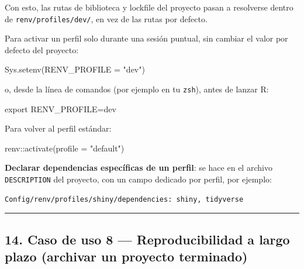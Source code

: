 \documentclass[
  man,
  floatsintext,
  longtable,
  a4paper,
  nolmodern,
  notxfonts,
  notimes,
  12pt,
  colorlinks=true,linkcolor=blue,citecolor=blue,urlcolor=blue]{apa7}
\newenvironment{Shaded}{\begin{snugshade}}{\end{snugshade}}
\newcommand{\AttributeTok}[1]{\textcolor[rgb]{0.40,0.45,0.13}{#1}}
\newcommand{\BuiltInTok}[1]{\textcolor[rgb]{0.00,0.23,0.31}{#1}}
\newcommand{\FunctionTok}[1]{\textcolor[rgb]{0.28,0.35,0.67}{#1}}
\newcommand{\NormalTok}[1]{\textcolor[rgb]{0.00,0.23,0.31}{#1}}
\newcommand{\OperatorTok}[1]{\textcolor[rgb]{0.37,0.37,0.37}{#1}}
\newcommand{\SpecialCharTok}[1]{\textcolor[rgb]{0.37,0.37,0.37}{#1}}
\newcommand{\StringTok}[1]{\textcolor[rgb]{0.13,0.47,0.30}{#1}}
\newcommand{\VariableTok}[1]{\textcolor[rgb]{0.07,0.07,0.07}{#1}}
\begin{document}
Con esto, las rutas de biblioteca y lockfile del proyecto pasan a
resolverse dentro de \texttt{renv/profiles/dev/}, en vez de las rutas
por defecto.

Para activar un perfil solo durante una sesión puntual, sin cambiar el
valor por defecto del proyecto:

\begin{Shaded}
\begin{Highlighting}[]
\FunctionTok{Sys.setenv}\NormalTok{(}\AttributeTok{RENV\_PROFILE =} \StringTok{"dev"}\NormalTok{)}
\end{Highlighting}
\end{Shaded}

o, desde la línea de comandos (por ejemplo en tu \texttt{zsh}), antes de
lanzar R:

\begin{Shaded}
\begin{Highlighting}[]
\BuiltInTok{export} \VariableTok{RENV\_PROFILE}\OperatorTok{=}\NormalTok{dev}
\end{Highlighting}
\end{Shaded}

Para volver al perfil estándar:

\begin{Shaded}
\begin{Highlighting}[]
\NormalTok{renv}\SpecialCharTok{::}\FunctionTok{activate}\NormalTok{(}\AttributeTok{profile =} \StringTok{"default"}\NormalTok{)}
\end{Highlighting}
\end{Shaded}

\textbf{Declarar dependencias específicas de un perfil}: se hace en el
archivo \texttt{DESCRIPTION} del proyecto, con un campo dedicado por
perfil, por ejemplo:

\begin{verbatim}
Config/renv/profiles/shiny/dependencies: shiny, tidyverse
\end{verbatim}

\begin{center}\rule{0.5\linewidth}{0.5pt}\end{center}

\subsection{14. Caso de uso 8 --- Reproducibilidad a largo plazo
(archivar un proyecto
terminado)}\label{caso-de-uso-8-reproducibilidad-a-largo-plazo-archivar-un-proyecto-terminado}
\end{document}
